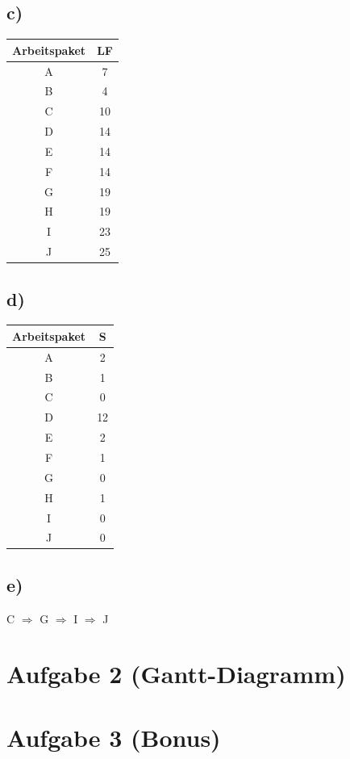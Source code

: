 \documentclass[a4paper]{report}
\begin{document}
\subsection*{c)}

\begin{center}
\begin{tabular}{ |c|c| } 
 \hline
 Arbeitspaket & LF \\ \hline
 A & 7 \\ 
 B & 4 \\ 
 C & 10 \\ 
 D & 14 \\ 
 E & 14 \\ 
 F & 14\\ 
 G & 19 \\ 
 H & 19\\ 
 I & 23 \\
 J & 25 \\
 \hline
\end{tabular}
\end{center}

\subsection*{d)}

\begin{center}
\begin{tabular}{ |c|c| } 
 \hline
 Arbeitspaket & S \\ \hline
 A & 2 \\ 
 B & 1 \\ 
 C & 0 \\ 
 D & 12 \\ 
 E & 2 \\ 
 F & 1 \\ 
 G & 0 \\ 
 H & 1 \\ 
 I & 0 \\
 J & 0 \\
 \hline
\end{tabular}
\end{center}

\subsection*{e)}

C $\Rightarrow$ G $\Rightarrow$ I $\Rightarrow$ J

\section*{Aufgabe 2 (Gantt-Diagramm)}

\section*{Aufgabe 3 (Bonus)}
\end{document}
